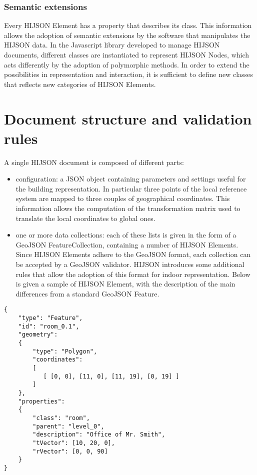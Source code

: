 \documentclass[]{article}
\begin{document}
\subsubsection{Semantic extensions}\label{semantic-extensions}

Every HIJSON Element has a property that describes its class. This
information allows the adoption of semantic extensions by the software
that manipulates the HIJSON data. In the Javascript library developed to
manage HIJSON documents, different classes are instantiated to represent
HIJSON Nodes, which acts differently by the adoption of polymorphic
methods. In order to extend the possibilities in representation and
interaction, it is sufficient to define new classes that reflects new
categories of HIJSON Elements.

\section{Document structure and validation
rules}\label{document-structure-and-validation-rules}

A single HIJSON document is composed of different parts:

\begin{itemize}
\itemsep1pt\parskip0pt
\item
  configuration: a JSON object containing parameters and settings useful
  for the building representation. In particular three points of the
  local reference system are mapped to three couples of geographical
  coordinates. This information allows the computation of the
  transformation matrix used to translate the local coordinates to
  global ones.
\item
  one or more data collections: each of these lists is given in the form
  of a GeoJSON FeatureCollection, containing a number of HIJSON
  Elements. Since HIJSON Elements adhere to the GeoJSON format, each
  collection can be accepted by a GeoJSON validator. HIJSON introduces
  some additional rules that allow the adoption of this format for
  indoor representation. Below is given a sample of HIJSON Element, with
  the description of the main differences from a standard GeoJSON
  Feature.
\end{itemize}

\begin{verbatim}
{
    "type": "Feature",
    "id": "room_0.1",
    "geometry": 
    {
        "type": "Polygon",
        "coordinates": 
        [ 
           [ [0, 0], [11, 0], [11, 19], [0, 19] ]
        ]    
    },
    "properties": 
    {
        "class": "room",
        "parent": "level_0",
        "description": "Office of Mr. Smith",
        "tVector": [10, 20, 0],
        "rVector": [0, 0, 90]
    }
}
\end{verbatim}
\end{document}
